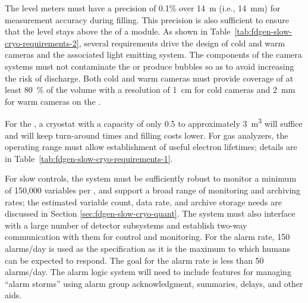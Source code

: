 The level meters must have a precision of 0.1\% over \SI{14}{m} (i.e., \SI{14}{mm}) for measurement accuracy during filling. This precision is also sufficient to ensure that the  level stays above the  of a  module. As shown in Table~\ref{tab:fdgen-slow-cryo-requirements-2}, several requirements drive the design of cold and warm cameras and the associated light emitting system. The components of the camera systems must not contaminate the  or produce bubbles %
so as  to avoid  increasing the risk of  discharge. Both cold and warm cameras must provide coverage of at least \SI{80}{\%} of the  volume 
with a resolution of \SI{1}{cm} for cold cameras and \SI{2}{mm} for warm cameras on the .

For the , a cryostat with a capacity of only \num{0.5} to approximately \SI{3}{m^3} %
will suffice and will keep turn-around times and filling costs %
lower. %
For gas analyzers, the operating range must allow establishment of useful electron lifetimes;
details  are in Table~\ref{tab:fdgen-slow-cryo-requirements-1}.

For slow controls, the system must
be sufficiently robust to monitor 
a minimum of 150,000 variables per , and 
support a broad range of monitoring and archiving rates;
the estimated variable count, data rate, and archive storage needs
are discussed in Section \ref{sec:fdgen-slow-cryo-quant}.
The system must also
interface with a large number of detector subsystems and
establish two-way communication with them for control and monitoring. 
For the alarm rate, 150 alarms/day is used as the specification as it is the maximum to which humans can be expected to respond. The goal for the alarm rate is less than 50 alarms/day. The alarm logic system will need to include features for managing ``alarm storms'' using alarm group acknowledgment, summaries, delays, and other aids.




